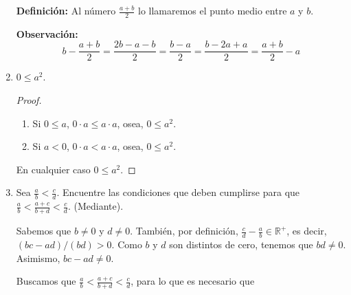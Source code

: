 \documentclass[11pt]{article}
\newcommand{\R}{\mathbb{R}}
\begin{document}
\begin{enumerate}[label=\alph*)]
    \textbf{Definición:} Al número $\frac{a+b}{2}$ lo llamaremos el punto medio entre $a$ y $b$.

    \textbf{Observación:} \[b-\frac{a+b}{2} = \frac{2b-a-b}{2}= \frac{b-a}{2}= \frac{b-2a+a}{2}= \frac{a+b}{2}-a\]

\pagebreak

    \item $0\leq a^2$.
    
    \vspace{-1em}\begin{proof}\leavevmode
        \begin{enumerate}[label=\roman*)]
        \item Si $0 \leq a$, $ 0\cdot a \leq a \cdot a$, osea, $0 \leq a^2$.
        \item Si $a<0$, $0\cdot a < a \cdot a$, osea, $0 \leq a^2$.
        \end{enumerate}En cualquier caso $0 \leq a^2$.
    \end{proof} \vspace{-1em}

    \item Sea $\frac{a}{b}<\frac{c}{d}$. Encuentre las condiciones que deben cumplirse para que $\frac{a}{b}<\frac{a+c}{b+d}<\frac{c}{d}$. (Mediante).

    Sabemos que $b\neq 0$ y $d\neq 0$. También, por definición, $\frac{c}{d}-\frac{a}{b}\in \R^+$, es decir, $(bc-ad)/(bd)>0$. Como $b$ y $d$ son distintos de cero, tenemos que $bd\neq 0$. Asimismo, $bc-ad\neq 0$.

    Buscamos que $\frac{a}{b}<\frac{a+c}{b+d}<\frac{c}{d}$, para lo que es necesario que


\end{enumerate}
\end{document}
